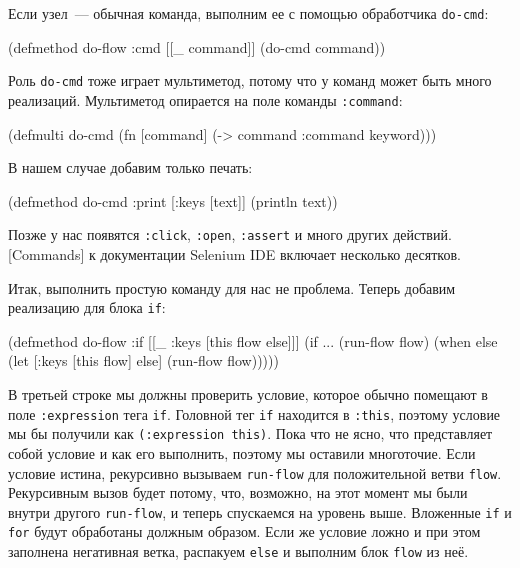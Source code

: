 Если узел~--- обычная команда, выполним ее с помощью обработчика \texttt{do-cmd}:

\begin{english}
  \begin{clojure}
(defmethod do-flow :cmd
  [[_ command]]
  (do-cmd command))
  \end{clojure}
\end{english}

Роль \texttt{do-cmd} тоже играет мультиметод, потому что у команд может быть
много реализаций. Мультиметод опирается на поле команды \texttt{:command}:

\begin{english}
  \begin{clojure}
(defmulti do-cmd
  (fn [command]
    (-> command :command keyword)))
  \end{clojure}
\end{english}

\noindent
В нашем случае добавим только печать:

\begin{english}
  \begin{clojure}
(defmethod do-cmd :print
  [{:keys [text]}]
  (println text))
  \end{clojure}
\end{english}

Позже у нас появятся \texttt{:click}, \texttt{:open}, \texttt{:assert} и много
других действий.  [Commands]
к документации Selenium IDE включает несколько десятков.

Итак, выполнить простую команду для нас не проблема. Теперь добавим реализацию
для блока \texttt{if}:

\begin{english}
  \begin{clojure/lines}
(defmethod do-flow :if
  [[_ {:keys [this flow else]}]]
  (if ...
    (run-flow flow)
    (when else
      (let [{:keys [this flow]} else]
        (run-flow flow)))))
  \end{clojure/lines}
\end{english}

В третьей строке мы должны проверить условие, которое обычно помещают в поле
\texttt{:expression} тега \texttt{if}. Головной тег \texttt{if} находится в
\texttt{:this}, поэтому условие мы бы получили как \texttt{(:expression this)}.
Пока что не ясно, что представляет собой условие и как его выполнить, поэтому мы
оставили многоточие. Если условие истина, рекурсивно вызываем \texttt{run-flow}
для положительной ветви \texttt{flow}. Рекурсивным вызов будет потому, что,
возможно, на этот момент мы были внутри другого \verb|run-flow|, и теперь
спускаемся на уровень выше. Вложенные \texttt{if} и \texttt{for} будут
обработаны должным образом. Если же условие ложно и при этом заполнена
негативная ветка, распакуем \verb|else| и выполним блок \texttt{flow} из неё.

